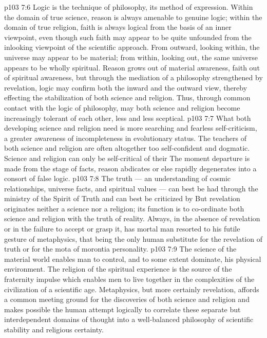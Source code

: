 \vs p103 7:6 Logic is the technique of philosophy, its method of expression. Within the domain of true science, reason is always amenable to genuine logic; within the domain of true religion, faith is always logical from the basis of an inner viewpoint, even though such faith may appear to be quite unfounded from the inlooking viewpoint of the scientific approach. From outward, looking within, the universe may appear to be material; from within, looking out, the same universe appears to be wholly spiritual. Reason grows out of material awareness, faith out of spiritual awareness, but through the mediation of a philosophy strengthened by revelation, logic may confirm both the inward and the outward view, thereby effecting the stabilization of both science and religion. Thus, through common contact with the logic of philosophy, may both science and religion become increasingly tolerant of each other, less and less sceptical.
\vs p103 7:7 What both developing science and religion need is more searching and fearless self\hyp{}criticism, a greater awareness of incompleteness in evolutionary status. The teachers of both science and religion are often altogether too self\hyp{}confident and dogmatic. Science and religion can only be self\hyp{}critical of their  The moment departure is made from the stage of facts, reason abdicates or else rapidly degenerates into a consort of false logic.
\vs p103 7:8 \pc The truth --- an understanding of cosmic relationships, universe facts, and spiritual values --- can best be had through the ministry of the Spirit of Truth and can best be criticized by  But revelation originates neither a science nor a religion; its function is to co\hyp{}ordinate both science and religion with the truth of reality. Always, in the absence of revelation or in the failure to accept or grasp it, has mortal man resorted to his futile gesture of metaphysics, that being the only human substitute for the revelation of truth or for the mota of morontia personality.
\vs p103 7:9 The science of the material world enables man to control, and to some extent dominate, his physical environment. The religion of the spiritual experience is the source of the fraternity impulse which enables men to live together in the complexities of the civilization of a scientific age. Metaphysics, but more certainly revelation, affords a common meeting ground for the discoveries of both science and religion and makes possible the human attempt logically to correlate these separate but interdependent domains of thought into a well\hyp{}balanced philosophy of scientific stability and religious certainty.
